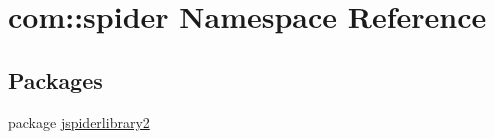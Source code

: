 \hypertarget{namespacecom_1_1spider}{\section{com\-:\-:spider \-Namespace \-Reference}
\label{namespacecom_1_1spider}
}
\subsection*{\-Packages}
\begin{DoxyCompactItemize}
\item 
package \hyperlink{namespacecom_1_1spider_1_1jspiderlibrary2}{jspiderlibrary2}
\end{DoxyCompactItemize}
